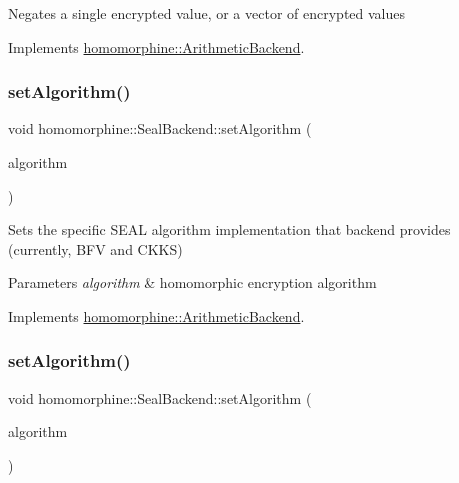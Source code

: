 Negates a single encrypted value, or a vector of encrypted values 

Implements \mbox{\hyperlink{classhomomorphine_1_1_arithmetic_backend_ad27913060534c42b5812a1e4cf21475f}{homomorphine\+::\+Arithmetic\+Backend}}.

\mbox{\label{classhomomorphine_1_1_seal_backend_a46a336bca80c5450a1f3ea1125d0d0e8}} 
\subsubsection{\texorpdfstring{setAlgorithm()}{setAlgorithm()}\hspace{0.1cm}{\footnotesize\ttfamily [1/2]}}
{\footnotesize\ttfamily void homomorphine\+::\+Seal\+Backend\+::set\+Algorithm (\begin{DoxyParamCaption}\item[{string}]{algorithm }\end{DoxyParamCaption})\hspace{0.3cm}{\ttfamily [virtual]}}

Sets the specific S\+E\+AL algorithm implementation that backend provides (currently, B\+FV and C\+K\+KS)


\begin{DoxyParams}{Parameters}
{\em algorithm} & homomorphic encryption algorithm \\
\hline
\end{DoxyParams}


Implements \mbox{\hyperlink{classhomomorphine_1_1_arithmetic_backend_ac53135f4f66a2f7a33d3c6e6d465b86f}{homomorphine\+::\+Arithmetic\+Backend}}.

\mbox{\label{classhomomorphine_1_1_seal_backend_aaf2100eb13b4434bc0136ff00578bb8d}} 
\subsubsection{\texorpdfstring{setAlgorithm()}{setAlgorithm()}\hspace{0.1cm}{\footnotesize\ttfamily [2/2]}}
{\footnotesize\ttfamily void homomorphine\+::\+Seal\+Backend\+::set\+Algorithm (\begin{DoxyParamCaption}\item[{Seal\+Algorithm}]{algorithm }\end{DoxyParamCaption})}

